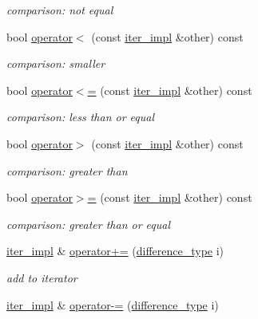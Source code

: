 \begin{DoxyCompactItemize}
\begin{DoxyCompactList}\small\item\em comparison\+: not equal \end{DoxyCompactList}\item 
bool \hyperlink{classnlohmann_1_1detail_1_1iter__impl_a0d14cd76203e00bdcef6a64a5d055cc7}{operator$<$} (const \hyperlink{classnlohmann_1_1detail_1_1iter__impl}{iter\+\_\+impl} \&other) const
\begin{DoxyCompactList}\small\item\em comparison\+: smaller \end{DoxyCompactList}\item 
bool \hyperlink{classnlohmann_1_1detail_1_1iter__impl_ac6f71b36d7c87e427d1fee83f2600fad}{operator$<$=} (const \hyperlink{classnlohmann_1_1detail_1_1iter__impl}{iter\+\_\+impl} \&other) const
\begin{DoxyCompactList}\small\item\em comparison\+: less than or equal \end{DoxyCompactList}\item 
bool \hyperlink{classnlohmann_1_1detail_1_1iter__impl_aaf3620b8dfa4bed8a9ac2b51dd55dbd7}{operator$>$} (const \hyperlink{classnlohmann_1_1detail_1_1iter__impl}{iter\+\_\+impl} \&other) const
\begin{DoxyCompactList}\small\item\em comparison\+: greater than \end{DoxyCompactList}\item 
bool \hyperlink{classnlohmann_1_1detail_1_1iter__impl_a634f85da575cb60b012a687efa26e11a}{operator$>$=} (const \hyperlink{classnlohmann_1_1detail_1_1iter__impl}{iter\+\_\+impl} \&other) const
\begin{DoxyCompactList}\small\item\em comparison\+: greater than or equal \end{DoxyCompactList}\item 
\hyperlink{classnlohmann_1_1detail_1_1iter__impl}{iter\+\_\+impl} \& \hyperlink{classnlohmann_1_1detail_1_1iter__impl_a3eef94f9d167046e7f773aeb6b78090c}{operator+=} (\hyperlink{classnlohmann_1_1detail_1_1iter__impl_a2f7ea9f7022850809c60fc3263775840}{difference\+\_\+type} i)
\begin{DoxyCompactList}\small\item\em add to iterator \end{DoxyCompactList}\item 
\hyperlink{classnlohmann_1_1detail_1_1iter__impl}{iter\+\_\+impl} \& \hyperlink{classnlohmann_1_1detail_1_1iter__impl_abcc9d51bc52f2e8483bbe4018f05e978}{operator-\/=} (\hyperlink{classnlohmann_1_1detail_1_1iter__impl_a2f7ea9f7022850809c60fc3263775840}{difference\+\_\+type} i)

\end{DoxyCompactItemize}
